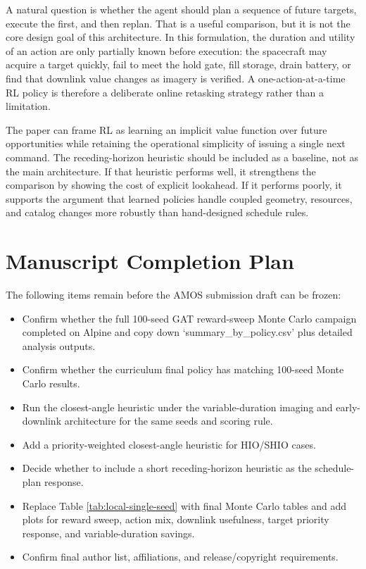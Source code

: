 \documentclass{amos}
\begin{document}
A natural question is whether the agent should plan a sequence of future targets, execute the first, and then replan. That is a useful comparison, but it is not the core design goal of this architecture. In this formulation, the duration and utility of an action are only partially known before execution: the spacecraft may acquire a target quickly, fail to meet the hold gate, fill storage, drain battery, or find that downlink value changes as imagery is verified. A one-action-at-a-time RL policy is therefore a deliberate online retasking strategy rather than a limitation.

The paper can frame RL as learning an implicit value function over future opportunities while retaining the operational simplicity of issuing a single next command. The receding-horizon heuristic should be included as a baseline, not as the main architecture. If that heuristic performs well, it strengthens the comparison by showing the cost of explicit lookahead. If it performs poorly, it supports the argument that learned policies handle coupled geometry, resources, and catalog changes more robustly than hand-designed schedule rules.

\section{Manuscript Completion Plan}

The following items remain before the AMOS submission draft can be frozen:

\begin{itemize}
  \item Confirm whether the full 100-seed GAT reward-sweep Monte Carlo campaign completed on Alpine and copy down `summary\_by\_policy.csv' plus detailed analysis outputs.
  \item Confirm whether the curriculum final policy has matching 100-seed Monte Carlo results.
  \item Run the closest-angle heuristic under the variable-duration imaging and early-downlink architecture for the same seeds and scoring rule.
  \item Add a priority-weighted closest-angle heuristic for HIO/SHIO cases.
  \item Decide whether to include a short receding-horizon heuristic as the schedule-plan response.
  \item Replace Table \ref{tab:local-single-seed} with final Monte Carlo tables and add plots for reward sweep, action mix, downlink usefulness, target priority response, and variable-duration savings.
  \item Confirm final author list, affiliations, and release/copyright requirements.
\end{itemize}
\end{document}
